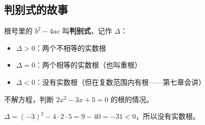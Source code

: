 \subsection*{判别式的故事}

根号里的 $b^2 - 4ac$ 叫\textbf{判别式}，记作 $\Delta$：

\begin{itemize}
  \item $\Delta > 0$：两个不相等的实数根
  \item $\Delta = 0$：两个相等的实数根（也叫重根）
  \item $\Delta < 0$：没有实数根（但在复数范围内有根——第七章会讲）
\end{itemize}

\begin{example}
不解方程，判断 $2x^2 - 3x + 5 = 0$ 的根的情况。
\end{example}
\begin{solution}
$\Delta = (-3)^2 - 4\cdot2\cdot5 = 9 - 40 = -31 < 0$，所以没有实数根。
\end{solution}


